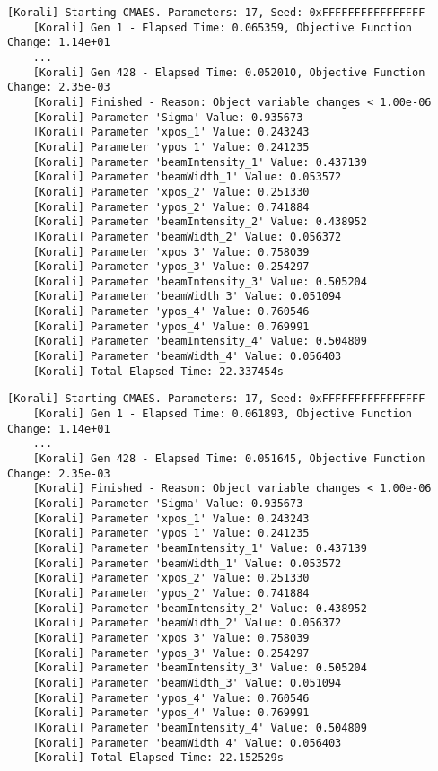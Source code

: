 \documentclass[11pt,a4paper]{article}
\begin{document}
\begin{lstlisting}[basicstyle=\tiny, frame=single, caption={Task 4: UPCXX producer-consumer parallel implementation output (n=24).}, label={lst:4UPCXX}]
	[Korali] Starting CMAES. Parameters: 17, Seed: 0xFFFFFFFFFFFFFFFF
	[Korali] Gen 1 - Elapsed Time: 0.065359, Objective Function Change: 1.14e+01
	...
	[Korali] Gen 428 - Elapsed Time: 0.052010, Objective Function Change: 2.35e-03
	[Korali] Finished - Reason: Object variable changes < 1.00e-06
	[Korali] Parameter 'Sigma' Value: 0.935673
	[Korali] Parameter 'xpos_1' Value: 0.243243
	[Korali] Parameter 'ypos_1' Value: 0.241235
	[Korali] Parameter 'beamIntensity_1' Value: 0.437139
	[Korali] Parameter 'beamWidth_1' Value: 0.053572
	[Korali] Parameter 'xpos_2' Value: 0.251330
	[Korali] Parameter 'ypos_2' Value: 0.741884
	[Korali] Parameter 'beamIntensity_2' Value: 0.438952
	[Korali] Parameter 'beamWidth_2' Value: 0.056372
	[Korali] Parameter 'xpos_3' Value: 0.758039
	[Korali] Parameter 'ypos_3' Value: 0.254297
	[Korali] Parameter 'beamIntensity_3' Value: 0.505204
	[Korali] Parameter 'beamWidth_3' Value: 0.051094
	[Korali] Parameter 'ypos_4' Value: 0.760546
	[Korali] Parameter 'ypos_4' Value: 0.769991
	[Korali] Parameter 'beamIntensity_4' Value: 0.504809
	[Korali] Parameter 'beamWidth_4' Value: 0.056403
	[Korali] Total Elapsed Time: 22.337454s
\end{lstlisting}

\begin{lstlisting}[basicstyle=\tiny, frame=single, caption={Task 4: MPI producer-consumer parallel implementation output (n=24).}, label={lst:4MPI}]
	[Korali] Starting CMAES. Parameters: 17, Seed: 0xFFFFFFFFFFFFFFFF
	[Korali] Gen 1 - Elapsed Time: 0.061893, Objective Function Change: 1.14e+01
	...
	[Korali] Gen 428 - Elapsed Time: 0.051645, Objective Function Change: 2.35e-03
	[Korali] Finished - Reason: Object variable changes < 1.00e-06
	[Korali] Parameter 'Sigma' Value: 0.935673
	[Korali] Parameter 'xpos_1' Value: 0.243243
	[Korali] Parameter 'ypos_1' Value: 0.241235
	[Korali] Parameter 'beamIntensity_1' Value: 0.437139
	[Korali] Parameter 'beamWidth_1' Value: 0.053572
	[Korali] Parameter 'xpos_2' Value: 0.251330
	[Korali] Parameter 'ypos_2' Value: 0.741884
	[Korali] Parameter 'beamIntensity_2' Value: 0.438952
	[Korali] Parameter 'beamWidth_2' Value: 0.056372
	[Korali] Parameter 'xpos_3' Value: 0.758039
	[Korali] Parameter 'ypos_3' Value: 0.254297
	[Korali] Parameter 'beamIntensity_3' Value: 0.505204
	[Korali] Parameter 'beamWidth_3' Value: 0.051094
	[Korali] Parameter 'ypos_4' Value: 0.760546
	[Korali] Parameter 'ypos_4' Value: 0.769991
	[Korali] Parameter 'beamIntensity_4' Value: 0.504809
	[Korali] Parameter 'beamWidth_4' Value: 0.056403
	[Korali] Total Elapsed Time: 22.152529s
\end{lstlisting}
\end{document}
